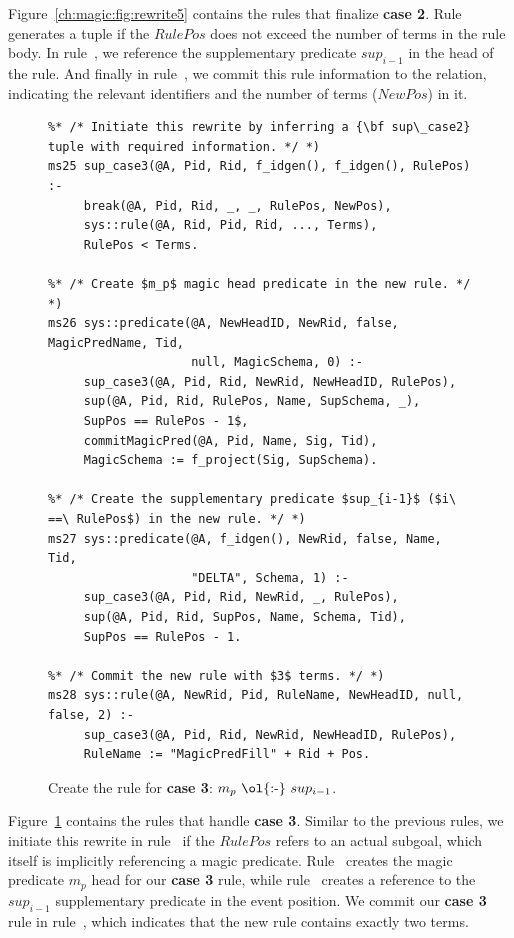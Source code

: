 Figure~\ref{ch:magic:fig:rewrite5} contains the rules that finalize {\bf case
2}.  Rule~ generates a  tuple if the $RulePos$ does not
exceed the number of terms in the rule body.  In rule~, we reference
the supplementary predicate $sup_{i-1}$ in the head of the rule.  And finally
in rule~, we commit this rule information to the  relation,
indicating the relevant identifiers and the number of terms ($NewPos$) in it.

\begin{figure}[!t]
\ssp
\centering
\begin{lstlisting}
%* /* Initiate this rewrite by inferring a {\bf sup\_case2} tuple with required information. */ *)
ms25 sup_case3(@A, Pid, Rid, f_idgen(), f_idgen(), RulePos) :-
     break(@A, Pid, Rid, _, _, RulePos, NewPos),
     sys::rule(@A, Rid, Pid, Rid, ..., Terms),
     RulePos < Terms.
	
%* /* Create $m_p$ magic head predicate in the new rule. */ *)
ms26 sys::predicate(@A, NewHeadID, NewRid, false, MagicPredName, Tid, 
                    null, MagicSchema, 0) :-
     sup_case3(@A, Pid, Rid, NewRid, NewHeadID, RulePos),
     sup(@A, Pid, Rid, RulePos, Name, SupSchema, _),
     SupPos == RulePos - 1$,
     commitMagicPred(@A, Pid, Name, Sig, Tid),
     MagicSchema := f_project(Sig, SupSchema).
	
%* /* Create the supplementary predicate $sup_{i-1}$ ($i\ ==\ RulePos$) in the new rule. */ *)
ms27 sys::predicate(@A, f_idgen(), NewRid, false, Name, Tid, 
                    "DELTA", Schema, 1) :-
     sup_case3(@A, Pid, Rid, NewRid, _, RulePos), 
     sup(@A, Pid, Rid, SupPos, Name, Schema, Tid),
     SupPos == RulePos - 1.

%* /* Commit the new rule with $3$ terms. */ *)
ms28 sys::rule(@A, NewRid, Pid, RuleName, NewHeadID, null, false, 2) :-
     sup_case3(@A, Pid, Rid, NewRid, NewHeadID, RulePos),
     RuleName := "MagicPredFill" + Rid + Pos.
\end{lstlisting}
\caption{\label{ch:magic:fig:rewrite6} 
Create the rule for {\bf case 3}: $m_p\ \text{\ol{:-}}\ sup_{i-1}$. } 
\end{figure}

Figure~\ref{ch:magic:fig:rewrite6} contains the rules that handle {\bf case 3}.
Similar to the previous rules, we initiate this rewrite in rule~ if
the $RulePos$ refers to an actual subgoal, which itself is implicitly
referencing a magic predicate.  Rule~ creates the magic predicate
$m_p$ head for our {\bf case 3} rule, while rule~ creates a reference
to the $sup_{i-1}$ supplementary predicate in the event position.
We commit our {\bf case 3} rule in rule~, which indicates that the
new rule contains exactly two terms.


